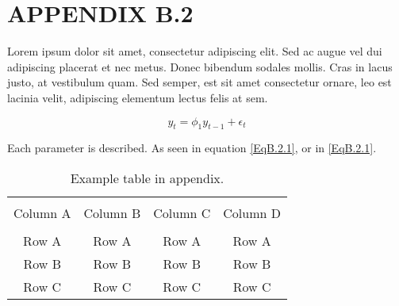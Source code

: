 \section*{APPENDIX B.2}
\renewcommand{\theequation}{B.2.\arabic{equation}}
\setcounter{equation}{0}

Lorem ipsum dolor sit amet, consectetur adipiscing elit. Sed ac augue vel dui adipiscing placerat et nec metus. Donec bibendum sodales mollis. Cras in lacus justo, at vestibulum quam. Sed semper, est sit amet consectetur ornare, leo est lacinia velit, adipiscing elementum lectus felis at sem.

\begin{equation}
y_{t} = \phi_{1} y_{t-1} + \epsilon_{t}
\label{EqB.2.1}
\end{equation}

Each parameter is described. As seen in equation \eqref{EqB.2.1}, or in \ref{EqB.2.1}.

\begin{table*}[!ht]
	{\setlength{\tabcolsep}{14pt}
		\caption{Example table in appendix.}
		\begin{center}
			\vspace{-6mm}
			\begin{tabular}{cccc}
				\hline \\[-2.45ex] \hline \\[-2.1ex]
				Column A & Column B & Column C & Column D \\
				\hline \\[-1.8ex]
				Row A & Row A & Row A & Row A \\
				Row B & Row B & Row B & Row B \\
				Row C & Row C & Row C & Row C \\
				[-0ex] \hline
			\end{tabular}
			\vspace{-6mm}
		\end{center}
		\label{TableB.2}}
\end{table*}